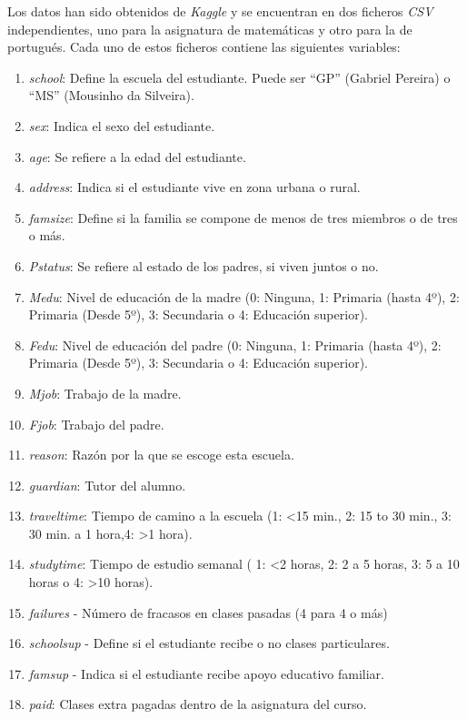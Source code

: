 \documentclass[12pt,a4paper]{article}
\begin{document}
Los datos han sido obtenidos de \textit{Kaggle} y se encuentran en dos ficheros \textit{CSV} independientes, uno para la asignatura de matemáticas y otro para la de portugués. Cada uno de estos ficheros contiene las siguientes variables: 

\begin{enumerate}
	\item \textit{school}: Define la escuela del estudiante. Puede ser ``GP'' (Gabriel Pereira) o ``MS'' (Mousinho da Silveira).
	\item \textit{sex}: Indica el sexo del estudiante.
	\item \textit{age}: Se refiere a la edad del estudiante.
	\item \textit{address}: Indica si el estudiante vive en zona urbana o rural.
	\item \textit{famsize}: Define si la familia se compone de menos de tres miembros o de tres o más.
	\item \textit{Pstatus}: Se refiere al estado de los padres, si viven juntos o no.
	\item \textit{Medu}: Nivel de educación de la madre (0: Ninguna, 1: Primaria (hasta 4º), 2: Primaria (Desde 5º), 3: Secundaria o  4: Educación superior).
	\item \textit{Fedu}: Nivel de educación del padre (0: Ninguna, 1: Primaria (hasta 4º), 2: Primaria (Desde 5º), 3: Secundaria o  4: Educación superior).
	\item \textit{Mjob}:  Trabajo de la madre.
	\item \textit{Fjob}: Trabajo del padre.
	\item \textit{reason}: Razón por la que se escoge esta escuela.
	\item \textit{guardian}: Tutor del alumno.
	\item \textit{traveltime}: Tiempo de camino a la escuela  (1: <15 min., 2: 15 to 30 min., 3: 30 min. a 1 hora,4: >1 hora).
	\item \textit{studytime}: Tiempo de estudio semanal ( 1: <2 horas, 2: 2 a 5 horas, 3: 5 a 10 horas o  4: >10 horas).
	\item \textit{failures} - Número de fracasos en clases pasadas (4 para 4 o más)
	\item \textit{schoolsup} - Define si el estudiante recibe o no clases particulares. 
	\item \textit{famsup} - Indica si el estudiante recibe apoyo educativo familiar.
	\item \textit{paid}: Clases extra pagadas dentro de la asignatura del curso. 

\end{enumerate}
\end{document}
